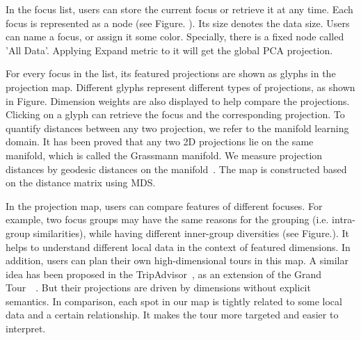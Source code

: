 In the focus list, users can store the current focus or retrieve it at any time. Each focus is represented as a node (see Figure. ). Its size denotes the data size. Users can name a focus, or assign it some color. Specially, there is a fixed node called 'All Data'. Applying Expand metric to it will get the global PCA projection.

For every focus in the list, its featured projections are shown as glyphs in the projection map. Different glyphs represent different types of projections, as shown in Figure.  Dimension weights are also displayed to help compare the projections. Clicking on a glyph can retrieve the focus and the corresponding projection. To quantify distances between any two projection, we refer to the manifold learning domain. It has been proved that any two 2D projections lie on the same manifold, which is called the Grassmann manifold. We measure projection distances by geodesic distances on the manifold~\cite{absil2004riemannian}. The map is constructed based on the distance matrix using MDS.

In the projection map, users can compare features of different focuses. For example, two focus groups may have the same reasons for the grouping (i.e. intra-group similarities), while having different inner-group diversities (see Figure.).  It helps to understand different local data in the context of featured dimensions. In addition, users can plan their own high-dimensional tours in this map. A similar idea has been proposed in the TripAdvisor~\cite{DBLP:journals/tvcg/NamM13}, as an extension of the Grand Tour~\cite{asimov1985grand}~\cite{cook1995grand}. But their projections are driven by dimensions without explicit semantics. In comparison, each spot in our map is tightly related to some local data and a certain relationship. It makes the tour more targeted and easier to interpret.